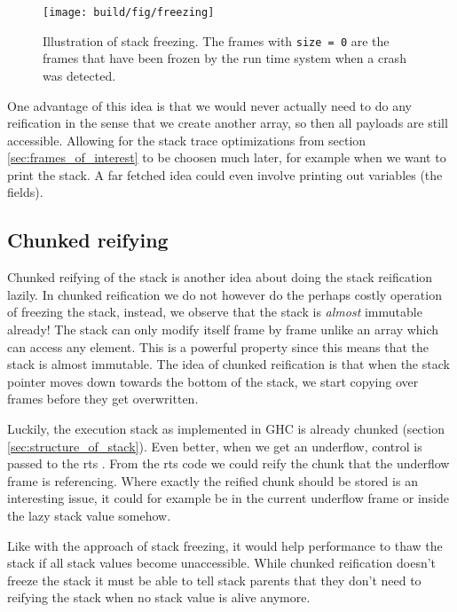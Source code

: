 \begin{figure}
\begin{mdframed}
  \texttt{[image: build/fig/freezing]}
  \caption{Illustration of stack freezing. The frames with \texttt{size = 0}
    are the frames that have been frozen by the run time system when a crash
    was detected.}
  \label{fig:freezing}
\end{mdframed}
\end{figure}

One advantage of this idea is that we would never actually need to
do any reification in the sense that we create another array, so
then all payloads are still accessible. Allowing for the stack trace
optimizations from section \ref{sec:frames_of_interest} to be choosen much later, for example
when we want to print the stack. A far fetched idea could even involve
printing out variables (the fields).

\subsection{Chunked reifying}

Chunked reifying of the stack is another idea about doing the stack
reification lazily. In chunked reification we do not however do the
perhaps costly operation of freezing the stack, instead, we observe
that the stack is \emph{almost} immutable already! The stack can only
modify itself frame by frame unlike an array which can access any
element. This is a powerful property since this means that the stack is
almost immutable. The idea of chunked reification is that when the stack
pointer moves down towards the bottom of the stack, we start
copying over frames before they get overwritten. 

Luckily, the execution stack as implemented in GHC is already chunked
(section \ref{sec:structure_of_stack}). Even better, when we get an
underflow, control is passed to the rts \cite{github_underflow_frame}.
From the rts code we could reify the chunk that the underflow frame is
referencing. Where exactly the reified chunk should be stored is an
interesting issue, it could for example be in the current underflow
frame or inside the lazy stack value somehow.

Like with the approach of stack freezing, it would help performance
to thaw the stack if all stack values become unaccessible. While chunked
reification doesn't freeze the stack it must be able to tell stack
parents that they don't need to reifying the stack when no stack value
is alive anymore.
